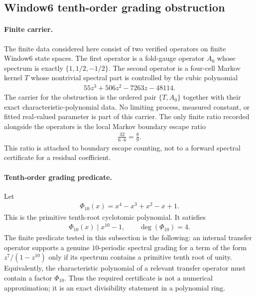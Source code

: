 
\subsection{Window6 tenth-order grading obstruction}
\label{sec:window6-dstar-tenth-order-grading-obstruction}

\paragraph{Finite carrier.}
The finite data considered here consist of two verified operators on finite Window6 state spaces.  The first operator is a fold-gauge operator $A_0$ whose spectrum is exactly $\{1,1/2,-1/2\}$.  The second operator is a four-cell Markov kernel $T$ whose nontrivial spectral part is controlled by the cubic polynomial
$$
\begin{aligned}
55z^3+506z^2-7263z-48114.
\end{aligned}
$$
The carrier for the obstruction is the ordered pair $\{T,A_0\}$ together with their exact characteristic-polynomial data.  No limiting process, measured constant, or fitted real-valued parameter is part of this carrier.  The only finite ratio recorded alongside the operators is the local Markov boundary escape ratio
$$
\begin{aligned}
\frac{32}{6\cdot 6}=\frac{8}{9}.
\end{aligned}
$$
This ratio is attached to boundary escape counting, not to a forward spectral certificate for a residual coefficient.

\paragraph{Tenth-order grading predicate.}
Let
$$
\begin{aligned}
\Phi_{10}(x)=x^4-x^3+x^2-x+1.
\end{aligned}
$$
This is the primitive tenth-root cyclotomic polynomial.  It satisfies
$$
\begin{aligned}
\Phi_{10}(x) \mid x^{10}-1,
\qquad
\deg(\Phi_{10})=4.
\end{aligned}
$$
The finite predicate tested in this subsection is the following: an internal transfer operator supports a genuine $10$-periodic spectral grading for a term of the form $z^7/(1-z^{10})$ only if its spectrum contains a primitive tenth root of unity.  Equivalently, the characteristic polynomial of a relevant transfer operator must contain a factor $\Phi_{10}$.  Thus the required certificate is not a numerical approximation; it is an exact divisibility statement in a polynomial ring.

